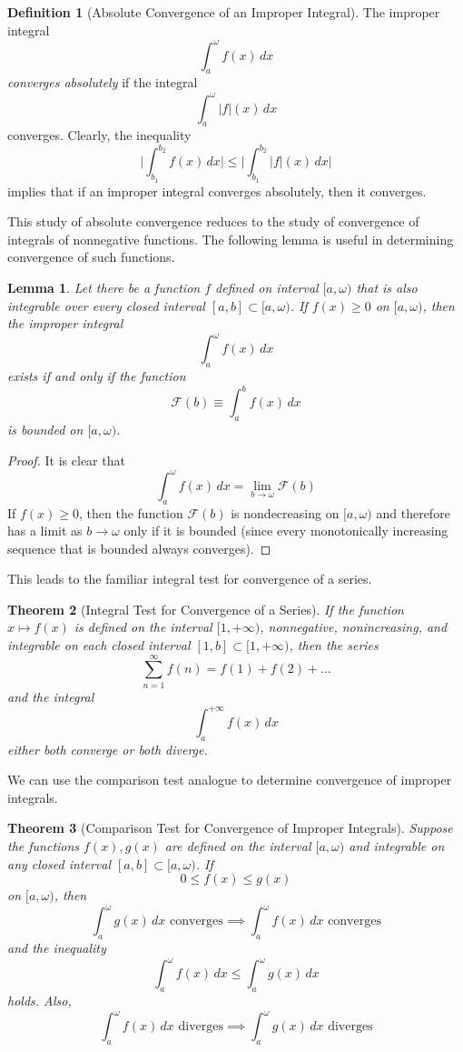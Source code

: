 \documentclass{article}
\newtheorem{theorem}{Theorem}[section]
\newtheorem{lemma}[theorem]{Lemma}
\theoremstyle{remark}
\theoremstyle{definition}
\newtheorem{definition}{Definition}[section]
\begin{document}
\begin{definition}[Absolute Convergence of an Improper Integral]
The improper integral 
\[\int_a^\omega f(x)\,dx\]
\textit{converges absolutely} if the integral
\[\int_a^\omega |f|(x)\,dx\]
converges. Clearly, the inequality
\[\Bigg| \int_{b_1}^{b_2} f(x)\,dx \Bigg| \leq \Bigg| \int_{b_1}^{b_2} |f|(x)\,dx \Bigg|\]
implies that if an improper integral converges absolutely, then it converges. 
\end{definition}

This study of absolute convergence reduces to the study of convergence of integrals of nonnegative functions. The following lemma is useful in determining convergence of such functions. 

\begin{lemma}
Let there be a function $f$ defined on interval $[a, \omega)$ that is also integrable over every closed interval $[a, b] \subset [a, \omega)$. If $f(x) \geq 0$ on $[a, \omega)$, then the improper integral 
\[\int_a^\omega f(x)\,dx\]
exists if and only if the function 
\[\mathcal{F}(b) \equiv \int_a^b f(x)\,dx\]
is bounded on $[a, \omega)$. 
\end{lemma}
\begin{proof}
It is clear that 
\[\int_a^\omega f(x)\,dx = \lim_{b \rightarrow \omega} \mathcal{F}(b)\]
If $f(x)\geq 0$, then the function $\mathcal{F}(b)$ is nondecreasing on $[a, \omega)$ and therefore has a limit as $b \rightarrow \omega$ only if it is bounded (since every monotonically increasing sequence that is bounded always converges). 
\end{proof}

This leads to the familiar integral test for convergence of a series. 

\begin{theorem}[Integral Test for Convergence of a Series]
If the function $x \mapsto f(x)$ is defined on the interval $[1, +\infty)$, nonnegative, nonincreasing, and integrable on each closed interval $[1, b] \subset [1, +\infty)$, then the series 
\[\sum_{n=1}^\infty f(n) = f(1) + f(2) + \ldots\]
and the integral 
\[\int_a^{+\infty} f(x)\,dx\]
either both converge or both diverge. 
\end{theorem}

We can use the comparison test analogue to determine convergence of improper integrals. 

\begin{theorem}[Comparison Test for Convergence of Improper Integrals]
Suppose the functions $f(x), g(x)$ are defined on the interval $[a, \omega)$ and integrable on any closed interval $[a, b] \subset [a, \omega)$. If 
\[0 \leq f(x) \leq g(x)\]
on $[a, \omega)$, then 
\[\int_a^\omega g(x)\,dx \text{ converges} \implies \int_a^\omega f(x)\,dx \text{ converges}\]
and the inequality 
\[\int_a^\omega f(x)\,dx \leq \int_a^\omega g(x)\,dx\]
holds. Also, 
\[\int_a^\omega f(x)\,dx \text{ diverges} \implies \int_a^\omega g(x)\,dx \text{ diverges}\]
\end{theorem}
\end{document}

